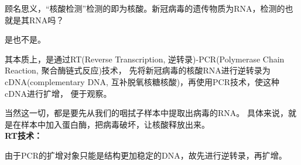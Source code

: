 \documentclass[UTF8,a4paper,11 pt]{ctexart}%
\begin{document}
	\def\GU#1{
		\edef\code{
			\unexpanded{\begin{scope}[xshift=}#1
				\unexpanded{cm, yshift=.3 cm]%
					\draw[fill=blue] (0,1.2) -- (0,0)--(.5,0)--(.5,1.2)arc (0:180:0.25);
					\node at (.25,.25) {G};
			\end{scope}}
		}\code
	}
	\def\AU#1{
		\edef\code{
			\unexpanded{\begin{scope}[xshift=}#1
				\unexpanded{cm, yshift=.3 cm]%
					\draw[fill=yellow] (0,1.2) -- (0,0)--(.5,0)--(.5,1.2) --(.25,1.45)--(0,1.2);
					\node at (.25,.25) {A};
			\end{scope}}
		}\code
	}
	\def\TU#1{
		\edef\code{
			\unexpanded{\begin{scope}[xshift=}#1
				\unexpanded{cm, yshift=.3 cm]%
					\draw[fill=green] (0,1) -- (0,0)--(.5,0)--(.5,1) --(.25,.75)--(0,1);
					\node at (.25,.25) {T};
			\end{scope}}
		}\code
	}
	\def\UU#1{
		\edef\code{
			\unexpanded{
				\begin{scope}[xshift=}#1
				\unexpanded{cm, yshift=.3 cm]%
					\draw[fill=orange] (0,1) -- (0,0)--(.5,0)--(.5,1) --(.25,.75)--(0,1);
					\node at (.25,.25) {U};
				\end{scope}
			}
		}\code
	}
	顾名思义，“核酸检测”检测的即为核酸。新冠病毒的遗传物质为RNA，检测的也就是其RNA吗？
	
	是也不是。
	
	其本质上，是通过RT(Reverse Transcription, 逆转录)-PCR(Polymerase Chain Reaction, 聚合酶链式反应)技术，
	先将新冠病毒的核酸RNA进行逆转录为cDNA(complementary DNA, 互补脱氧核糖核酸)，再使用PCR技术，使这种cDNA进行扩增，
	便于观察。
	
	当然这一切，都是要先从我们的咽拭子样本中提取出病毒的RNA。
	具体来说，就是在样本中加入蛋白酶，把病毒破坏，让核酸释放出来。
	\\\textbf{RT技术：}
	
	由于PCR的扩增对象只能是结构更加稳定的DNA，故先进行逆转录，再扩增。
	
\end{document}
